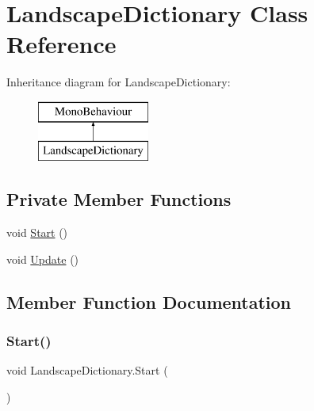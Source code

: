 \hypertarget{class_landscape_dictionary}{}\section{Landscape\+Dictionary Class Reference}
\label{class_landscape_dictionary}
Inheritance diagram for Landscape\+Dictionary\+:\begin{figure}[H]
\begin{center}
\leavevmode
\includegraphics[height=2.000000cm]{class_landscape_dictionary}
\end{center}
\end{figure}
\subsection*{Private Member Functions}
\begin{DoxyCompactItemize}
\item 
void \hyperlink{class_landscape_dictionary_af7832ca835e7deea26761554ba3adf26}{Start} ()
\item 
void \hyperlink{class_landscape_dictionary_a7a8ccbe99b7a687d79fb34d32061c401}{Update} ()
\end{DoxyCompactItemize}


\subsection{Member Function Documentation}
\mbox{\label{class_landscape_dictionary_af7832ca835e7deea26761554ba3adf26}} 
\subsubsection{\texorpdfstring{Start()}{Start()}}
{\footnotesize\ttfamily void Landscape\+Dictionary.\+Start (\begin{DoxyParamCaption}{ }\end{DoxyParamCaption})\hspace{0.3cm}{\ttfamily [private]}}

\mbox{\label{class_landscape_dictionary_a7a8ccbe99b7a687d79fb34d32061c401}} 
